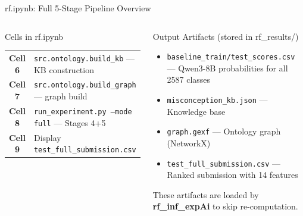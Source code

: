 \documentclass[aspectratio=169]{beamer}
\begin{document}
\begin{frame}{rf.ipynb: Full 5-Stage Pipeline Overview}
\begin{columns}[T]
\begin{block}{Cells in rf.ipynb}
\begin{tabular}{cp{6cm}}
\textbf{Cell 6} & \texttt{src.ontology.build\_kb} --- KB construction\\
\textbf{Cell 7} & \texttt{src.ontology.build\_graph} --- graph build\\
\textbf{Cell 8} & \texttt{run\_experiment.py --mode full} --- Stages 4+5\\
\textbf{Cell 9} & Display \texttt{test\_full\_submission.csv}\\
\end{tabular}
\end{block}
\begin{block}{Output Artifacts (stored in rf\_results/)}
\footnotesize
\begin{itemize}
  \item \texttt{baseline\_train/test\_scores.csv} --- Qwen3-8B probabilities for all 2587 classes
  \item \texttt{misconception\_kb.json} --- Knowledge base
  \item \texttt{graph.gexf} --- Ontology graph (NetworkX)
  \item \texttt{test\_full\_submission.csv} --- Ranked submission with 14 features
\end{itemize}
These artifacts are loaded by \textbf{rf\_inf\_expAi} to skip re-computation.
\end{block}
\end{columns}
\end{frame}
\end{document}
